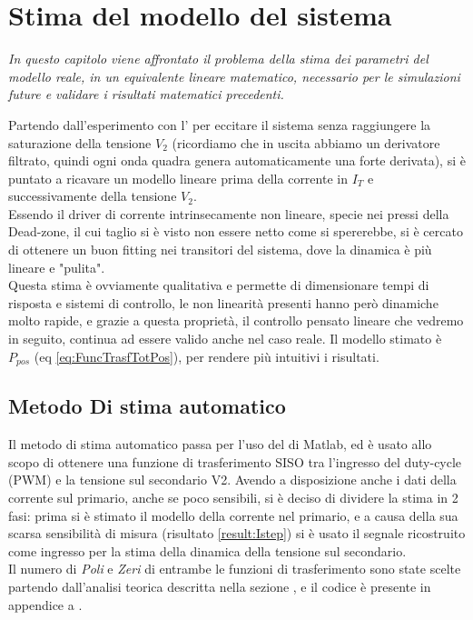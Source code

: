 \chapter{Stima del modello del sistema}\label{cap:stimaModello}

\begin{minipage}{12cm}\textit{
	In questo capitolo viene affrontato il problema della stima dei parametri del modello reale, in un equivalente lineare matematico, necessario per le simulazioni future e validare i risultati matematici precedenti.}
\end{minipage}

\vspace*{1cm}
\noindent
Partendo dall'esperimento con l' per eccitare il sistema senza raggiungere la saturazione della tensione $ V_2 $ (ricordiamo che in uscita abbiamo un derivatore filtrato, quindi ogni onda quadra genera automaticamente una forte derivata), si è puntato a ricavare un modello lineare prima della corrente in $ I_T $ e successivamente della tensione $ V_2 $.\\
Essendo il driver di corrente intrinsecamente non lineare, specie nei pressi della Dead-zone, il cui taglio si è visto non essere netto come si spererebbe, si è cercato di ottenere un buon fitting nei transitori del sistema, dove la dinamica è più lineare e "pulita".\\
Questa stima è ovviamente qualitativa e permette di dimensionare tempi di risposta e sistemi di controllo, le non linearità presenti hanno però dinamiche molto rapide, e grazie a questa proprietà, il controllo pensato lineare che vedremo in seguito, continua ad essere valido anche nel caso reale.
Il modello stimato è $ P_{pos} $ (eq \ref{eq:FuncTrasfTotPos}), per rendere più intuitivi i risultati.

\newpage

\section{Metodo Di stima automatico}
Il metodo di stima automatico passa per l'uso del \cite*{IdentificationToolbox} di Matlab, ed è usato allo scopo di ottenere una funzione di trasferimento SISO tra l'ingresso del duty-cycle (PWM) e la tensione sul secondario V2. Avendo a disposizione anche i dati della corrente sul primario, anche se poco sensibili, si è deciso di dividere la stima in 2 fasi: prima si è stimato il modello della corrente nel primario, e a causa della sua scarsa sensibilità di misura (risultato \ref{result:Istep}) si è usato il segnale ricostruito come ingresso per la stima della dinamica della tensione sul secondario.\\
Il numero di \textit{Poli} e \textit{Zeri} di entrambe le funzioni di trasferimento sono state scelte partendo dall'analisi teorica descritta nella sezione , e il codice è presente in appendice a .

